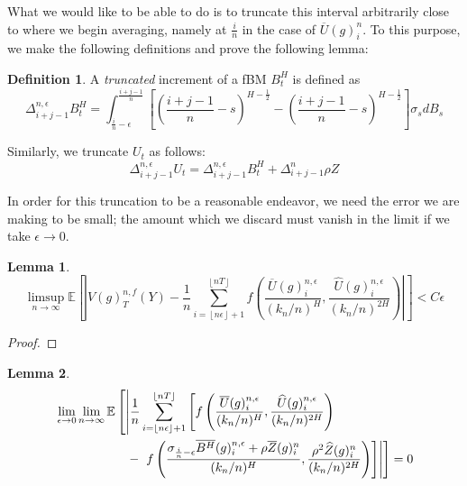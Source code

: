 \documentclass[12pt,letterpaper]{article}
\newtheorem{lemma}{Lemma}
\theoremstyle{definition}
\newtheorem*{definition}{Definition}
\newcommand{\E}{\mathbb{E}}
\begin{document}
What we would like to be able to do is to truncate this interval arbitrarily close to where we begin averaging, namely at \(\frac{i}{n}\) in the case of \(\overline{U}(g)^n_i\). To this purpose, we make the following definitions and prove the following lemma:

\begin{definition}
  A \textit{truncated} increment of a fBM \(B^H_t\) is defined as
  \begin{equation}
    \Delta_{i+j-1}^{n,\epsilon} B^H_t =  \int_{\frac{i}{n}-\epsilon}^{\frac{i+j-1}{n}} \left[ \left( \frac{i+j-1}{n} -s \right)^{H - \frac{1}{2}} - \left( \frac{i+j-1}{n} -s \right)^{H - \frac{1}{2}} \right]\sigma_s dB_s
  \end{equation}

  Similarly, we truncate \(U_t\) as follows:
  \begin{equation}
    \Delta_{i+j-1}^{n,\epsilon} U_t = \Delta_{i+j-1}^{n,\epsilon} B^H_t + \Delta_{i+j-1}^n \rho Z
  \end{equation}
\end{definition}

In order for this truncation to be a reasonable endeavor, we need the error we are making to be small; the amount which we discard must vanish in the limit if we take \(\epsilon \rightarrow 0\).

\begin{lemma}
  \begin{equation}
    \limsup_{n \rightarrow \infty} \E \left[ \left| V(g)^{n,f}_T(Y) - \frac{1}{n}\sum_{i=\left\lfloor n\epsilon \right\rfloor + 1}^{\left\lfloor nT \right\rfloor} f\left( \frac{\overline{U}(g)^{n,\epsilon}_i}{(k_n/n)^H}, \frac{\widehat{U}(g)^{n,\epsilon}_i}{(k_n/n)^{2H}} \right) \right| \right] < C\epsilon
  \end{equation}
\end{lemma}

\begin{proof}
\end{proof}

\begin{lemma}
  \begin{align}
    \phantom{}
    \begin{aligned}
      &\lim_{\epsilon \rightarrow 0}\lim_{n \rightarrow \infty}\E \left[ \left| \frac{1}{n}\sum_{i=\left\lfloor n\epsilon \right\rfloor + 1}^{\left\lfloor nT \right\rfloor} \left[ f\left( \frac{\overline{U}(g)^{n,\epsilon}_i}{(k_n/n)^H}, \frac{\widehat{U}(g)^{n,\epsilon}_i}{(k_n/n)^{2H}} \right) \right. \right. \right. \\
      & \hspace*{2cm} - \left. \left. \left. f\left( \frac{\sigma_{\frac{i}{n}-\epsilon}\overline{B^H}(g)^{n,\epsilon}_i + \rho\overline{Z}(g)^n_i}{(k_n/n)^{H}}, \frac{\rho^2\widehat{Z}(g)^n_i}{(k_n/n)^{2H}}\right) \right] \right| \right] = 0
    \end{aligned}
  \end{align}
\end{lemma}
\end{document}
